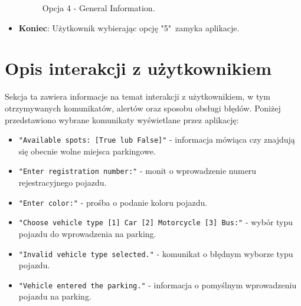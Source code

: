 \begin{itemize}
\begin{figure}[H]
        \caption{Opcja 4 - General Information.}
        \end{figure} 
\item \textbf{Koniec}:
    Użytkownik wybierając opcję "5"\ zamyka aplikacje.
\end{itemize}
\clearpage
\section{Opis interakcji z użytkownikiem}
Sekcja ta zawiera informacje na temat interakcji z użytkownikiem, w tym otrzymywanych komunikatów, alertów oraz sposobu obsługi błędów. Poniżej przedstawiono wybrane komunikaty wyświetlane przez aplikację:

\begin{itemize}
    \item \texttt{"Available spots: [True lub False]"} - informacja mówiąca czy znajdują się obecnie wolne miejsca parkingowe.
    \item \texttt{"Enter registration number:"} - monit o wprowadzenie numeru rejestracyjnego pojazdu.
    \item \texttt{"Enter color:"} - prośba o podanie koloru pojazdu.
    \item \texttt{"Choose vehicle type [1] Car [2] Motorcycle [3] Bus:"} - wybór typu pojazdu do wprowadzenia na parking.
    \item \texttt{"Invalid vehicle type selected."} - komunikat o błędnym wyborze typu pojazdu.
    \item \texttt{"Vehicle entered the parking."} - informacja o pomyślnym wprowadzeniu pojazdu na parking.
\end{itemize}
